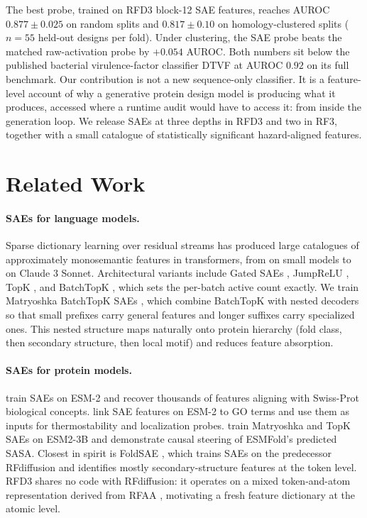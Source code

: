 \documentclass{article}
\theoremstyle{plain}
\theoremstyle{definition}
\theoremstyle{remark}
\begin{document}
The best probe, trained on RFD3 block-12 SAE features, reaches AUROC $0.877 \pm 0.025$ on random splits and $0.817 \pm 0.10$ on homology-clustered splits ($n{=}55$ held-out designs per fold). Under clustering, the SAE probe beats the matched raw-activation probe by $+0.054$ AUROC. Both numbers sit below the published bacterial virulence-factor classifier DTVF \cite{sun2024dtvf} at AUROC $0.92$ on its full benchmark. Our contribution is not a new sequence-only classifier. It is a feature-level account of why a generative protein design model is producing what it produces, accessed where a runtime audit would have to access it: from inside the generation loop. We release SAEs at three depths in RFD3 and two in RF3, together with a small catalogue of statistically significant hazard-aligned features.

\section{Related Work}
\label{sec:related}

\paragraph{SAEs for language models.} Sparse dictionary learning over residual streams has produced large catalogues of approximately monosemantic features in transformers, from \citet{bricken2023monosemanticity,cunningham2024sparse} on small models to \citet{templeton2024scaling} on Claude 3 Sonnet. Architectural variants include Gated SAEs \cite{rajamanoharan2024gated}, JumpReLU \cite{rajamanoharan2024jumprelu}, TopK \cite{makhzani2014ksparse,gao2025scaling}, and BatchTopK \cite{bussmann2024batchtopk}, which sets the per-batch active count exactly. We train Matryoshka BatchTopK SAEs \cite{bussmann2025matryoshka}, which combine BatchTopK with nested decoders so that small prefixes carry general features and longer suffixes carry specialized ones. This nested structure maps naturally onto protein hierarchy (fold class, then secondary structure, then local motif) and reduces feature absorption.

\paragraph{SAEs for protein models.} \citet{simon2025interplm} train SAEs on ESM-2 \cite{lin2023evolutionaryscale} and recover thousands of features aligning with Swiss-Prot biological concepts. \citet{adams2025mechanistic} link SAE features on ESM-2 to GO terms and use them as inputs for thermostability and localization probes. \citet{parsan2025interpretable} train Matryoshka and TopK SAEs on ESM2-3B and demonstrate causal steering of ESMFold's predicted SASA. Closest in spirit is FoldSAE \cite{zarzecki2025foldsae}, which trains SAEs on the predecessor RFdiffusion \cite{watson2023rfdiffusion} and identifies mostly secondary-structure features at the token level. RFD3 shares no code with RFdiffusion: it operates on a mixed token-and-atom representation derived from RFAA \cite{krishna2024rfaa,abramson2024alphafold3}, motivating a fresh feature dictionary at the atomic level.
\end{document}
